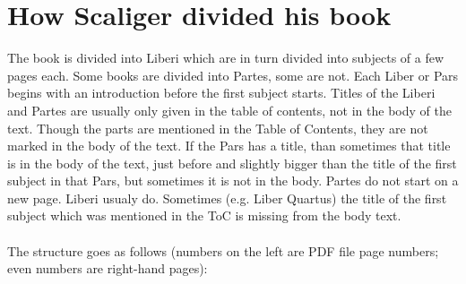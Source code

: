 \documentclass{report}
\begin{document}
\chapter{How Scaliger divided his book}
The book is divided into Liberi which are in turn divided into subjects of
 a few pages each. Some books are divided into Partes, some are not.
 Each Liber or Pars begins with an introduction before the first subject starts. 
 Titles of the Liberi and Partes are usually only given in the table of
 contents, not in the body of the text. Though the parts are mentioned in the
 Table of Contents, they are not marked in the body of the text.
 If the Pars has a title, than sometimes that title is in the body of the text,
 just before and slightly bigger than the title of the first subject in that
 Pars, but sometimes it is not in the body. Partes do not start on a new page.
 Liberi usualy do. Sometimes (e.g. Liber Quartus) the title of the first
 subject which was mentioned in the ToC is missing from the body text.
~
\\
\\
The structure goes as follows (numbers on the left are PDF file page numbers;
 even numbers are right-hand pages):
\end{document}

